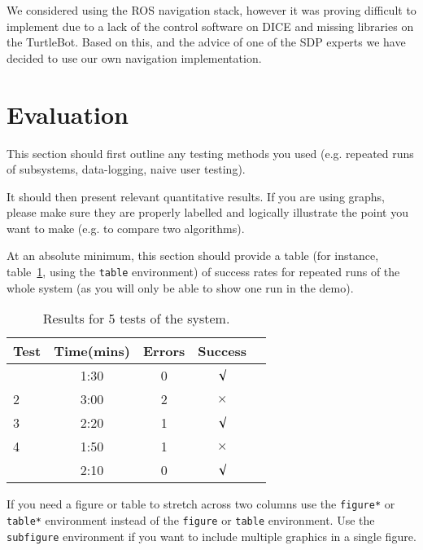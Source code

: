 \documentclass{article}
\begin{document}
We considered using the ROS navigation stack, however it was proving difficult to implement due to a lack of the control software on DICE and missing libraries on the TurtleBot. 
Based on this, and the advice of one of the SDP experts we have decided to use our own navigation implementation.

\section{Evaluation}

This section should first outline any testing methods you used (e.g. repeated runs of subsystems, data-logging, naive user testing). 

It should then present relevant quantitative results. If you are using graphs, please make sure they are properly labelled and logically illustrate the point you want to make (e.g. to compare two algorithms).

At an absolute minimum, this section should provide a table (for instance, table~\ref{tab:sample-table}, using the \verb+table+ environment) of success rates for repeated runs of the whole system (as you will only be able to show one run in the demo).

\begin{table}[h]
\vskip 3mm
\begin{center}
\begin{small}
\begin{sc}
\begin{tabular}{lcccr}
\hline
\abovespace\belowspace
Test  & Time(mins) & Errors & Success \\
\hline
\abovespace
1    & 1:30 & 0 & $\surd$ \\
2    & 3:00 & 2 & $\times$\\
3    & 2:20 & 1 & $\surd$ \\
4    & 1:50 & 1 & $\times$\\
\belowspace
5    & 2:10 & 0 & $\surd$ \\
\hline
\end{tabular}
\end{sc}
\end{small}
\caption{Results for 5 tests of the system.}
\label{tab:sample-table}
\end{center}
\vskip -3mm
\end{table}

If you need a figure or table to stretch across two columns use the \verb+figure*+ or \verb+table*+ environment instead of the \verb+figure+ or \verb+table+ environment.  Use the \verb+subfigure+ environment if you want to include multiple graphics in a single figure.
\end{document}
